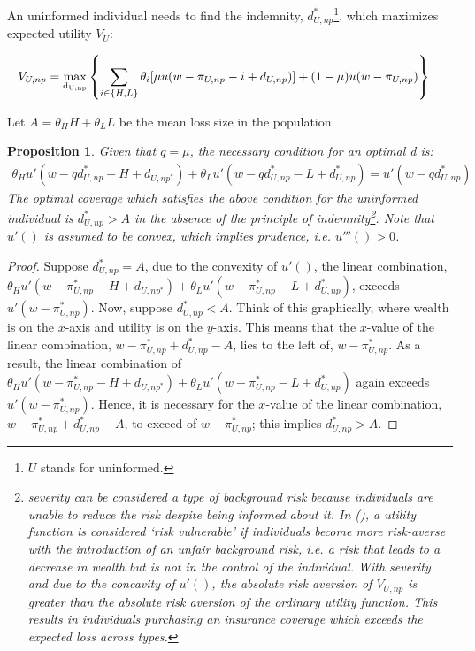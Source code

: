 \documentclass[nonatbib,preprint,12pt]{elsarticle}
\theoremstyle{plain}
\newtheorem{prop}[theorem]{Proposition}
\theoremstyle{definition}
\theoremstyle{plain}
\theoremstyle{TheoremNum}
\theoremstyle{CorollaryNum}
\theoremstyle{PropositionNum}
\theoremstyle{TheoremNum}
\begin{document}
An uninformed individual needs to find the indemnity, $d_{U,np}^*$\footnote{$U$ stands for uninformed.}, which maximizes expected utility $V_U$:

\begin{align}
    V_{U,np} & = \underset{\rm d_{U,np}}{\rm max } \left\{\sum_{i \in \{H,L\}} \theta_i[\mu u(w-\pi_{U,np}-i+d_{U,np})] +(1-\mu)u(w-\pi_{U,np}) \right\}
\label{uninformed_np_maxproblem}
\end{align}

Let $A=\theta_H H + \theta_L L$ be the mean loss size in the population. 


\setcounter{theorem}{0}
\renewcommand{\thetheorem}{\arabic{theorem}}

\begin{prop}
Given that $q=\mu$, the necessary condition for an optimal d is:
\begin{align}
\theta_H u'(w-qd_{U,np}^*-H+d_{U,np^*}) + \theta_L u'(w-qd_{U,np}^*-L+d_{U,np}^*) = u'(w-qd_{U,np}^*)
\end{align}
The optimal coverage which satisfies the above condition for the uninformed individual is $d_{U,np}^* > A$ in the absence of the principle of indemnity\footnote{severity can be considered a type of background risk because individuals are unable to reduce the risk despite being informed about it. In \citeauthor{gollier1996risk} (\citeyear{gollier1996risk}), a utility function is considered `risk vulnerable' if individuals become more risk-averse with the introduction of an unfair background risk, i.e. a risk that leads to a decrease in wealth but is not in the control of the individual. With severity and due to the concavity of $u'()$, the absolute risk aversion of $V_{U,np}$ is greater than the absolute risk aversion of the ordinary utility function. This results in individuals purchasing an insurance coverage which exceeds the expected loss across types.}. Note that $u'()$ is assumed to be convex, which implies prudence, i.e. $u'''()>0$.
\end{prop}

\begin{proof}
Suppose $d_{U,np}^* = A$, due to the convexity of $u'()$, the linear combination, $\theta_H u'(w-\pi_{U,np}^*-H+d_{U,np^*}) + \theta_L u'(w-\pi_{U,np}^*-L+d_{U,np}^*)$, exceeds $u'(w-\pi_{U,np}^*)$. Now, suppose $d_{U,np}^* < A$. Think of this graphically, where wealth is on the $x$-axis and utility is on the $y$-axis. This means that the $x$-value of the linear combination, $w-\pi_{U,np}^*+d_{U,np}^*-A$, lies to the left of, $w-\pi_{U,np}^*$. As a result, the linear combination of $\theta_H u'(w-\pi_{U,np}^*-H+d_{U,np^*}) + \theta_L u'(w-\pi_{U,np}^*-L+d_{U,np}^*)$ again exceeds $u'(w-\pi_{U,np}^*)$. Hence, it is necessary for the $x$-value of the linear combination, $w-\pi_{U,np}^*+d_{U,np}^*-A$, to exceed of $w-\pi_{U,np}^*$; this implies $d_{U,np}^* > A$.
\end{proof}
\end{document}

